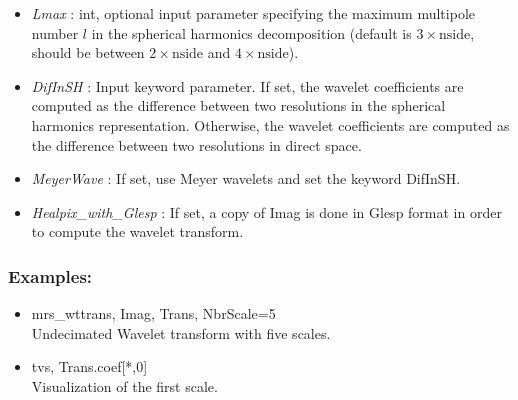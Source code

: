 \begin{itemize}
\item {\em Lmax} : int, optional input parameter specifying the maximum multipole number $l$ in the spherical harmonics decomposition 
(default is $3\times \textrm{nside}$, should be between $2\times \textrm{nside}$ and $4\times \textrm{nside}$).
\item {\em DifInSH} : Input keyword parameter. If set, the wavelet coefficients are computed as the difference between two resolutions in the spherical harmonics representation. 
Otherwise, the wavelet coefficients are computed as the difference between two resolutions in direct space.
\item {\em MeyerWave} : If set, use Meyer wavelets and set the keyword DifInSH.
\item {\em Healpix\_with\_Glesp} : If set, a copy of Imag is done in Glesp format in order to compute the wavelet transform.
\end{itemize}

\subsubsection*{Examples:} 
\begin{itemize}
\item mrs\_wttrans, Imag, Trans, NbrScale=5 \\
Undecimated Wavelet transform with five scales.
\item tvs, Trans.coef[*,0]  \\
Visualization of the first scale.
\end{itemize}


